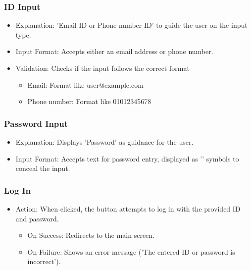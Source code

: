 \documentclass[conference]{IEEEtran}
\begin{document}
\subsubsection{ID Input}
\begin{itemize}
    \item Explanation: 'Email ID or Phone number ID' to guide the user on the input type.\\
    \item Input Format: Accepts either an email address or phone number.\\
    \item Validation: Checks if the input follows the correct format
\begin{itemize}
    \item Email: Format like user@example.com\\
    \item Phone number: Format like 01012345678\\
\end{itemize}
\end{itemize}

\subsubsection{Password Input}
\begin{itemize}
    \item Explanation: Displays 'Password' as guidance for the user.\\
    \item Input Format: Accepts text for password entry, displayed as '\textbullet' symbols to conceal the input.\\
\end{itemize}

\subsubsection{Log In}
\begin{itemize}
    \item Action: When clicked, the button attempts to log in with the provided ID and password.
\begin{itemize}
    \item On Success: Redirects to the main screen.\\
    \item On Failure: Shows an error message ('The entered ID or password is incorrect').\\
\end{itemize}
\end{itemize}
\end{document}
